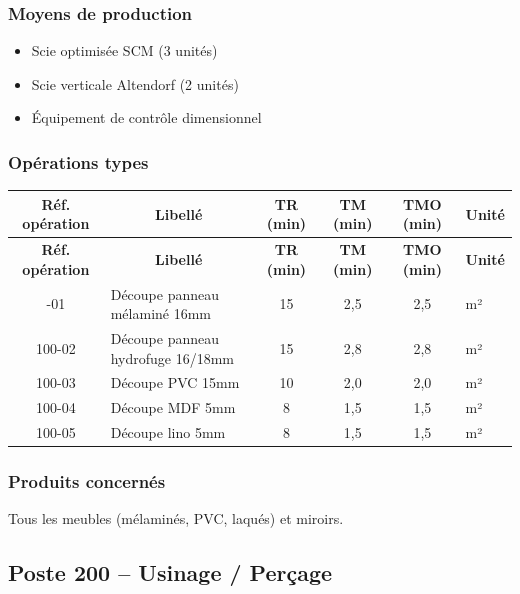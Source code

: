 \documentclass[12pt,a4paper]{article}
\begin{document}
\subsubsection{Moyens de production}
\begin{itemize}
    \item Scie optimisée SCM (3 unités)
    \item Scie verticale Altendorf (2 unités)
    \item Équipement de contrôle dimensionnel
\end{itemize}

\subsubsection{Opérations types}

\begin{longtable}{|c|p{5cm}|c|c|c|p{3cm}|}
\hline
\multicolumn{1}{|c|}{\textbf{Réf. opération}} & \multicolumn{1}{c|}{\textbf{Libellé}} & \multicolumn{1}{c|}{\textbf{TR (min)}} & \multicolumn{1}{c|}{\textbf{TM (min)}} & \multicolumn{1}{c|}{\textbf{TMO (min)}} & \multicolumn{1}{c|}{\textbf{Unité}} \\
\hline
\endfirsthead
\hline
\multicolumn{1}{|c|}{\textbf{Réf. opération}} & \multicolumn{1}{c|}{\textbf{Libellé}} & \multicolumn{1}{c|}{\textbf{TR (min)}} & \multicolumn{1}{c|}{\textbf{TM (min)}} & \multicolumn{1}{c|}{\textbf{TMO (min)}} & \multicolumn{1}{c|}{\textbf{Unité}} \\
\hline
\endhead
\hline
\endfoot
100-01 & Découpe panneau mélaminé 16mm & 15 & 2,5 & 2,5 & m² \\
100-02 & Découpe panneau hydrofuge 16/18mm & 15 & 2,8 & 2,8 & m² \\
100-03 & Découpe PVC 15mm & 10 & 2,0 & 2,0 & m² \\
100-04 & Découpe MDF 5mm & 8 & 1,5 & 1,5 & m² \\
100-05 & Découpe lino 5mm & 8 & 1,5 & 1,5 & m² \\
\hline
\end{longtable}

\subsubsection{Produits concernés}
Tous les meubles (mélaminés, PVC, laqués) et miroirs.

\subsection{Poste 200 – Usinage / Perçage}
\end{document}
